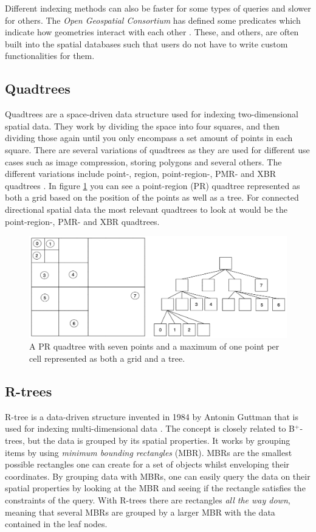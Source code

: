 Different indexing methods can also be faster for some types of queries and slower for others. The \textit{Open Geospatial Consortium} has defined some predicates which indicate how geometries interact with each other \cite{spatial_predicates}. These, and others, are often built into the spatial databases such that users do not have to write custom functionalities for them.

\subsection{Quadtrees}
Quadtrees are a space-driven data structure used for indexing two-dimensional spatial data. They work by dividing the space into four squares, and then dividing those again until you only encompass a set amount of points in each square. There are several variations of quadtrees as they are used for different use cases such as image compression, storing polygons and several others. The different variations include point-, region, point-region-, PMR- and XBR quadtrees \cite{quadtrees}. In figure \ref{fig:quadtree} you can see a point-region (PR) quadtree represented as both a grid based on the position of the points as well as a tree. For connected directional spatial data the most relevant quadtrees to look at would be the point-region-, PMR- and XBR quadtrees.

\begin{figure}
	\centering
	\includegraphics[width=\textwidth]{figures/quadtree.excalidraw.png}
	\caption{A PR quadtree with seven points and a maximum of one point per cell represented as both a grid and a tree.}
	\label{fig:quadtree}
\end{figure}

\subsection{R-trees}
R-tree is a data-driven structure invented in 1984 by Antonin Guttman that is used for indexing multi-dimensional data \cite{r_trees}. The concept is closely related to B$^{+}$-trees, but the data is grouped by its spatial properties. It works by grouping items by using \textit{minimum bounding rectangles} (MBR). MBRs are the smallest possible rectangles one can create for a set of objects whilst enveloping their coordinates. By grouping data with MBRs, one can easily query the data on their spatial properties by looking at the MBR and seeing if the rectangle satisfies the constraints of the query. With R-trees there are rectangles \textit{all the way down}, meaning that several MBRs are grouped by a larger MBR with the data contained in the leaf nodes. \\

